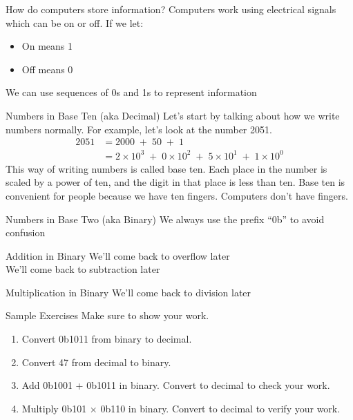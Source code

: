 

\begin{frame}{How do computers store information?}
Computers work using electrical signals which can be on or off. If we let:
\begin{itemize}
    \item On means 1
    \item Off means 0
\end{itemize}
We can use sequences of 0s and 1s to represent information
\end{frame}


\begin{frame}{Numbers in Base Ten (aka Decimal)}
Let's start by talking about how we write numbers normally. For example, let's look at the number 2051. 
\begin{align*}
2051 &= 2000 \;+\; 50 \;+\; 1 \\
&= 2 \times 10^3 \;+\; 0 \times 10^2 \;+\; 5 \times 10^1 \;+\; 1 \times 10^0
\end{align*}
This way of writing numbers is called base ten. Each place in the number is scaled by a power of ten, and the digit in that place is less than ten. 
Base ten is convenient for people because we have ten fingers. 
Computers don't have fingers.
\end{frame}
    
\begin{frame}{Numbers in Base Two (aka Binary)}
We always use the prefix ``0b'' to avoid confusion
\end{frame}

\begin{frame}{Addition in Binary}
We'll come back to overflow later \\
We'll come back to subtraction later
\end{frame}
    
\begin{frame}{Multiplication in Binary}
We'll come back to division later
\end{frame}


\begin{frame}{Sample Exercises}
Make sure to show your work.
\vfill 
\begin{enumerate}
    \item Convert 0b1011 from binary to decimal. 
    \vfill
    \item Convert 47 from decimal to binary.
    \vfill
    \item Add 0b1001 + 0b1011 in binary. Convert to decimal to check your work.
    \vfill
    \item Multiply 0b101 $\times$ 0b110 in binary. Convert to decimal to verify your work.
    \vfill 
\end{enumerate}
\end{frame}




